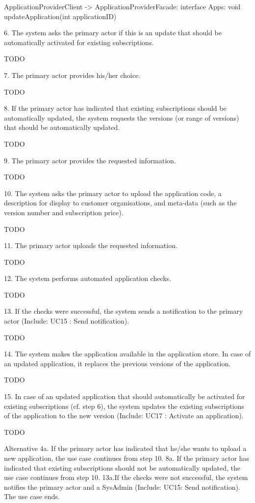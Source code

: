             ApplicationProviderClient -> ApplicationProviderFacade: interface Apps:
                                                void updateApplication(int applicationID)


        6. The system asks the primary actor if this is an update that should be automatically activated for existing subscriptions.

            TODO

        7. The primary actor provides his/her choice.

            TODO

        8. If the primary actor has indicated that existing subscriptions should be automatically updated, the system requests the versions (or range of versions) that should be automatically updated.

            TODO

        9. The primary actor provides the requested information.

            TODO

        10. The system asks the primary actor to upload the application code, a description for display to customer organisations, and meta-data (such as the version number and subscription price).

            TODO

        11. The primary actor uploads the requested information.

            TODO

        12. The system performs automated application checks.

            TODO

        13. If the checks were successful, the system sends a notification to the primary actor (Include: UC15 : Send notification).

            TODO

        14. The system makes the application available in the application store. In case of an updated application, it replaces the previous versions of the application.

            TODO

        15. In case of an updated application that should automatically be activated for existing subscriptions (cf. step 6), the system updates the existing subscriptions of the application to the new version (Include: UC17 : Activate an application).

            TODO

        Alternative
            4a. If the primary actor has indicated that he/she wants to upload a new application, the use case
                continues from step 10.
            8a. If the primary actor has indicated that existing subscriptions should not be automatically
                updated, the use case continues from step 10.
            13a.If the checks were not successful, the system notifies the primary actor and a SysAdmin
                (Include: UC15: Send notification). The use case ends.


